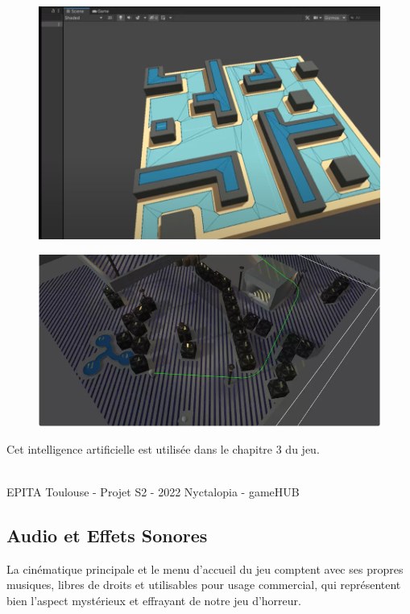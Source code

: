 \begin{figure}[H]
\centering
\begin{minipage}{.5\textwidth}
  \centering
  \includegraphics[width=.7\linewidth]{img/navmesh.PNG}
  \label{fig:navmesh}
\end{minipage}%
\begin{minipage}{.5\textwidth}
  \centering
  \includegraphics[width=.7\linewidth]{img/path.png}
  \label{fig:pathfinding}
\end{minipage}
\end{figure}

Cet intelligence artificielle est utilisée dans le chapitre 3 du jeu.

\vfill
\noindent\makebox[\linewidth]{\rule{.8\paperwidth}{.6pt}}\\[0.2cm]
EPITA Toulouse - Projet S2 - 2022 \hfill Nyctalopia - gameHUB
\noindent\makebox[\linewidth]{\rule{.8\paperwidth}{.6pt}}

\newpage

\subsection{Audio et Effets Sonores}
\setlength{\parindent}{5ex}
La cinématique principale et le menu d’accueil du jeu comptent avec ses propres musiques, libres de droits et utilisables pour usage commercial, qui représentent bien l’aspect mystérieux et effrayant de notre jeu d’horreur.

